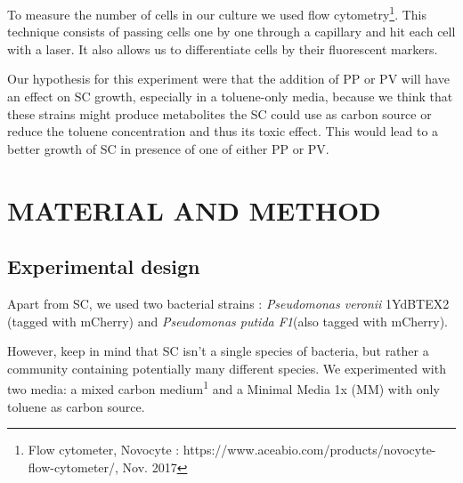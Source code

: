\documentclass[a4paper, 10pt, conference]{ieeeconf}   %
\begin{document}
To measure the number of cells in our culture we used flow cytometry\footnote{Flow cytometer, Novocyte : https://www.aceabio.com/products/nov\linebreak[0]ocyte-flow-cytometer/, Nov. 2017}. This technique consists of passing cells one by one through a capillary and hit each cell with a laser. It also allows us to differentiate cells by their fluorescent markers.




Our hypothesis for this experiment were that the addition of PP or PV will have an effect on SC growth, especially in a toluene-only media, because we think that these strains might produce metabolites the SC could use as carbon source or reduce the toluene concentration and thus its toxic effect. This would lead to a better growth of SC in presence of one of either PP or PV.


\section{MATERIAL AND METHOD}

\subsection{Experimental design}
Apart from SC, we used two bacterial strains : \textit{Pseudomonas veronii} 1YdBTEX2 (tagged with mCherry) and \textit{Pseudomonas putida F1}(also tagged with mCherry).

However, keep in mind that SC isn't a single species of bacteria, but rather a community containing potentially many different species.
We experimented with two media: a mixed carbon medium\textsuperscript{1} and a Minimal Media 1x (MM) with only toluene as carbon source.
\end{document}
